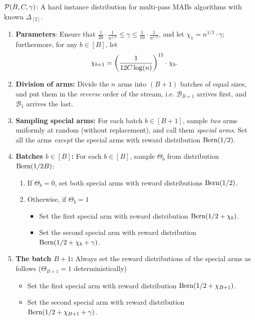 \begin{tbox}
	$\mathcal{P}(B, C, \gamma)$: A hard instance distribution for multi-pass MABs algorithms with known $\Delta_{[2]}$. 
	
	\begin{enumerate}
		\item \textbf{Parameters}: Ensure that $\frac{1}{20}\cdot \frac{1}{n^{1/3}}\leq \gamma \leq \frac{1}{10}\cdot \frac{1}{n^{1/3}}$, and let $\chi_{1}=n^{1/3}\cdot \gamma$; furthermore, for any $b\in [B]$, let 
		\[\chi_{b+1} = \left(\frac{1}{12 C \log(n)}\right)^{15} \cdot \chi_{b}.\]
		\item \textbf{Division of arms:} Divide the $n$ arms into $(B+1)$ batches of equal sizes, and put them in the \emph{reverse} order of the stream, i.e. $\mathcal{B}_{B+1}$ arrives first, and $\mathcal{B}_{1}$ arrives the last.
		\item \textbf{Sampling special arms: } For each batch $b\in [B+1]$, sample \emph{two} arms uniformly at random (without replacement), and call them \emph{special arms}. Set all the arms \emph{except} the special arms with reward distribution $\textnormal{Bern}(1/2)$.
		\item \textbf{Batches $b\in[B]$: } For each $b\in [B]$, sample $\Theta_{b}$ from distribution $\textnormal{Bern}(1/2B)$:
		\begin{enumerate}
			\item If $\Theta_{b}=0$, set both special arms with reward distributions $\textnormal{Bern}(1/2)$.
			\item Otherwise, if $\Theta_{b}=1$ 
			\begin{itemize}
				\item Set the first special arm with reward distribution $\textnormal{Bern}(1/2+\chi_{b})$.
				\item Set the second special arm with reward distribution $\textnormal{Bern}(1/2+\chi_{b}+\gamma)$.
			\end{itemize}
		\end{enumerate}
		\item \textbf{The batch $B+1$: } Always set the reward distributions of the special arms as follows ($\Theta_{B+1}=1$ deterministically) %
		\begin{itemize}
			\item Set the first special arm with reward distribution $\textnormal{Bern}(1/2+\chi_{B+1})$.
			\item Set the second special arm with reward distribution $\textnormal{Bern}(1/2+\chi_{B+1}+\gamma)$.
		\end{itemize}
	\end{enumerate}
\end{tbox}


